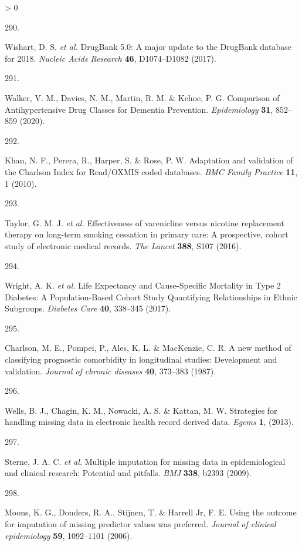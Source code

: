 \documentclass[a4paper, twoside]{templates/ociamthesis}
\newlength{\cslhangindent}
\newlength{\csllabelwidth}
\newenvironment{CSLReferences}[3] %
 {%
  \setlength{\parindent}{0pt}
  \ifodd #1 \everypar{\setlength{\hangindent}{\cslhangindent}}\ignorespaces\fi
  \ifnum #2 > 0
  \setlength{\parskip}{#2\baselineskip}
  \fi
 }%
 {}
\newcommand{\CSLLeftMargin}[1]{\parbox[t]{\maxof{\widthof{#1}}{\csllabelwidth}}{#1}}
\newcommand{\CSLRightInline}[1]{\parbox[t]{\linewidth - \csllabelwidth}{#1}}
\begin{document}
\begin{CSLReferences}{0}{0}
\leavevmode\hypertarget{ref-wishart2017}{}%
\CSLLeftMargin{290. }
\CSLRightInline{Wishart, D. S. \emph{et al.} {DrugBank} 5.0: A major update to the {DrugBank} database for 2018. \emph{Nucleic Acids Research} \textbf{46}, D1074--D1082 (2017).}

\leavevmode\hypertarget{ref-walker2020}{}%
\CSLLeftMargin{291. }
\CSLRightInline{Walker, V. M., Davies, N. M., Martin, R. M. \& Kehoe, P. G. Comparison of {Antihypertensive Drug Classes} for {Dementia Prevention}. \emph{Epidemiology} \textbf{31}, 852--859 (2020).}

\leavevmode\hypertarget{ref-khan2010}{}%
\CSLLeftMargin{292. }
\CSLRightInline{Khan, N. F., Perera, R., Harper, S. \& Rose, P. W. Adaptation and validation of the {Charlson Index} for {Read}/{OXMIS} coded databases. \emph{BMC Family Practice} \textbf{11}, 1 (2010).}

\leavevmode\hypertarget{ref-taylor2016}{}%
\CSLLeftMargin{293. }
\CSLRightInline{Taylor, G. M. J. \emph{et al.} Effectiveness of varenicline versus nicotine replacement therapy on long-term smoking cessation in primary care: A prospective, cohort study of electronic medical records. \emph{The Lancet} \textbf{388}, S107 (2016).}

\leavevmode\hypertarget{ref-wright2017}{}%
\CSLLeftMargin{294. }
\CSLRightInline{Wright, A. K. \emph{et al.} Life {Expectancy} and {Cause}-{Specific Mortality} in {Type} 2 {Diabetes}: A {Population}-{Based Cohort Study Quantifying Relationships} in {Ethnic Subgroups}. \emph{Diabetes Care} \textbf{40}, 338--345 (2017).}

\leavevmode\hypertarget{ref-charlson1987new}{}%
\CSLLeftMargin{295. }
\CSLRightInline{Charlson, M. E., Pompei, P., Ales, K. L. \& MacKenzie, C. R. A new method of classifying prognostic comorbidity in longitudinal studies: Development and validation. \emph{Journal of chronic diseases} \textbf{40}, 373--383 (1987).}

\leavevmode\hypertarget{ref-wells2013strategies}{}%
\CSLLeftMargin{296. }
\CSLRightInline{Wells, B. J., Chagin, K. M., Nowacki, A. S. \& Kattan, M. W. Strategies for handling missing data in electronic health record derived data. \emph{Egems} \textbf{1}, (2013).}

\leavevmode\hypertarget{ref-sterne2009}{}%
\CSLLeftMargin{297. }
\CSLRightInline{Sterne, J. A. C. \emph{et al.} Multiple imputation for missing data in epidemiological and clinical research: Potential and pitfalls. \emph{BMJ} \textbf{338}, b2393 (2009).}

\leavevmode\hypertarget{ref-moons2006}{}%
\CSLLeftMargin{298. }
\CSLRightInline{Moons, K. G., Donders, R. A., Stijnen, T. \& Harrell Jr, F. E. Using the outcome for imputation of missing predictor values was preferred. \emph{Journal of clinical epidemiology} \textbf{59}, 1092--1101 (2006).}


\end{CSLReferences}
\end{document}
